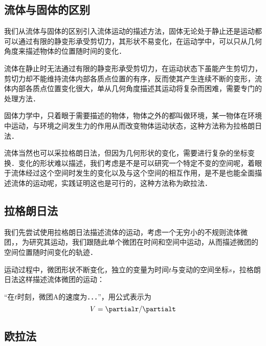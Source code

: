 \subsection{流体与固体的区别}
我们从流体与固体的区别引入流体运动的描述方法，固体无论处于静止还是运动都可以通过有限的静变形承受剪切力，其形状不易变化，在运动学中，可以只从几何角度来描述物体的位置随时间的变化．

流体在静止时无法通过有限的静变形承受剪切力，在运动状态下虽能产生剪切力，剪切力却不能维持流体内部各质点位置的有序，反而使其产生连续不断的变形，流体内部各质点位置变化很大，单从几何角度描述其运动将复杂而困难，需要专门的处理方法．

固体力学中，只着眼于需要描述的物体，物体之外的都叫做环境，某一物体在环境中运动，与环境之间发生力的作用从而改变物体运动状态，这种方法称为拉格朗日法．

流体当然也可以采拉格朗日法，但因为几何形状的变化，需要进行复杂的坐标变换．变化的形状难以描述，我们考虑是不是可以研究一个特定不变的空间呢，着眼于流体经过这个空间时发生的变化以及与这个空间的相互作用，是不是也能全面描述流体的运动呢，实践证明这也是可行的，这种方法称为欧拉法．

\subsection{拉格朗日法}
我们先尝试使用拉格朗日法描述流体的运动，考虑一个无穷小的不规则流体微团，，为研究其运动，我们跟随此单个微团在时间和空间中运动，从而描述微团的空间位置随时间变化的轨迹．

运动过程中，微团形状不断变化，独立的变量为时间$t$与变动的空间坐标$s$，拉格朗日法这样描述流体微团的运动：

“在$t$时刻，微团A的速度为．．．”，用公式表示为
\begin{equation}
V=\partialr/\partialt
\end{equation}


\subsection{欧拉法}